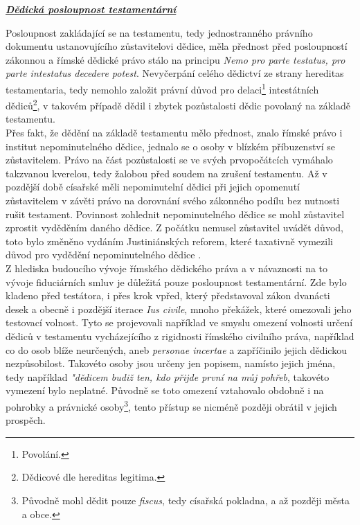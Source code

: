\documentclass{article}
\begin{document}
\vspace{5 mm}


\underline{\textbf{\textit{Dědická posloupnost testamentární}}}

\vspace*{5 mm}

Posloupnost zakládající se na testamentu, tedy jednostranného právního dokumentu ustanovujícího zůstavitelovi dědice, měla přednost před posloupností zákonnou a římské dědické právo stálo na principu \textit{Nemo pro parte testatus, pro parte intestatus decedere potest}. Nevyčerpání celého dědictví ze strany hereditas testamentaria, tedy nemohlo založit právní důvod pro delaci\footnote{Povolání.} intestátních dědiců\footnote{Dědicové dle hereditas legitima.}, v takovém případě dědil i zbytek pozůstalosti dědic povolaný na základě testamentu. \\

Přes fakt, že dědění na základě testamentu mělo přednost, znalo římské právo i institut nepominutelného dědice, jednalo se o osoby v blízkém příbuzen\-ství se zůstavitelem. Právo na část pozůstalosti se ve svých prvopočátcích vymáhalo takzvanou kverelou, tedy žalobou před soudem na zrušení testamentu. Až v pozdější době císařské měli nepominutelní dědici při jejich opomenutí zůstavitelem v závěti právo na dorovnání svého zákonného podílu bez nutnosti rušit testament. Povinnost zohlednit nepominutelného dědice se mohl zůstavitel zprostit vyděděním daného dědice. Z počátku nemusel zůstavitel uvádět důvod, toto bylo změněno vydáním Justiniánských reforem, které taxativně vymezili důvod pro vydědění nepominutelného dědice  . \\

Z hlediska budoucího vývoje římského dědického práva a v návaznosti na to vývoje fiduciárních smluv je důležitá pouze posloupnost testamentární. Zde bylo kladeno před testátora, i přes krok vpřed, který představoval zákon dvanácti desek a obecně i pozdější iterace \textit{Ius civile}, mnoho překážek, které omezovali jeho testovací volnost. Tyto se projevovali například ve smyslu omezení volnosti určení dědiců v testamentu vycházejícího z rigidnosti římského civilního práva, například co do osob blíže neurčených, aneb \textit{personae incertae} a zapříčinilo jejich dědickou nezpůsobilost. Takovéto osoby jsou určeny jen popisem, namísto jejich jména, tedy například \textit{"dědicem budiž ten, kdo přijde první na můj pohřeb}, takovéto vymezení bylo neplatné. Původně se toto omezení vztahovalo obdobně i na pohrobky a právnické osoby\footnote{Původně mohl dědit pouze \textit{fiscus}, tedy císařská pokladna, a až později města a obce.}, tento přístup se nicméně později obrátil v jejich prospěch.\\
\end{document}
